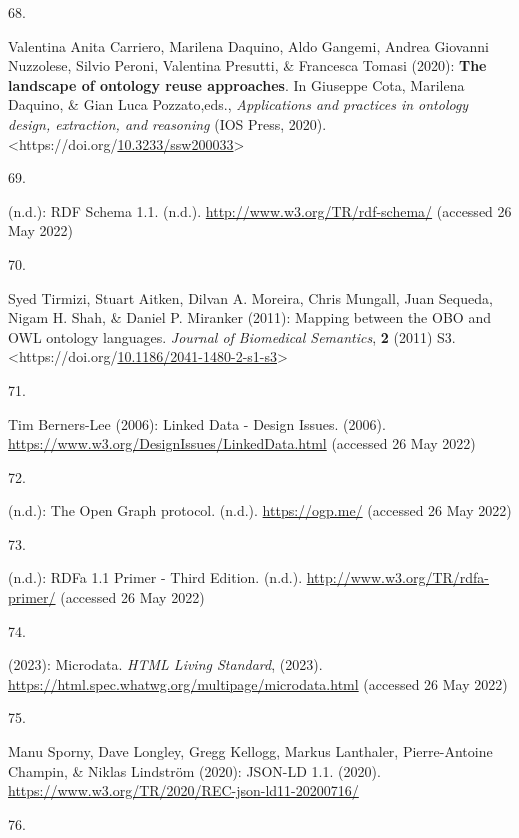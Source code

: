 \begin{thebibliography}{9}
\hypertarget{ref-carrieroLandscapeOntologyReuse2020a}{}
68.

Valentina Anita Carriero, Marilena Daquino, Aldo Gangemi, Andrea
Giovanni Nuzzolese, Silvio Peroni, Valentina Presutti, \& Francesca
Tomasi (2020): \textbf{The landscape of ontology reuse approaches}. In
Giuseppe Cota, Marilena Daquino, \& Gian Luca Pozzato,eds.,
\emph{Applications and practices in ontology design, extraction, and
reasoning} ({IOS Press}, 2020).
\textless https://doi.org/\href{https://doi.org/10.3233/ssw200033}{10.3233/ssw200033}\textgreater{}

\hypertarget{ref-w3-rdf-schema}{}
69.

(n.d.): {RDF Schema} 1.1. (n.d.). \url{http://www.w3.org/TR/rdf-schema/}
(accessed 26 May 2022)

\hypertarget{ref-tirmiziMappingOBOOWL2011a}{}
70.

Syed Tirmizi, Stuart Aitken, Dilvan A. Moreira, Chris Mungall, Juan
Sequeda, Nigam H. Shah, \& Daniel P. Miranker (2011): Mapping between
the {OBO} and {OWL} ontology languages. \emph{Journal of Biomedical
Semantics}, \textbf{2} (2011) S3.
\textless https://doi.org/\href{https://doi.org/10.1186/2041-1480-2-s1-s3}{10.1186/2041-1480-2-s1-s3}\textgreater{}

\hypertarget{ref-LinkedDataDesign}{}
71.

Tim Berners-Lee (2006): Linked {Data} - {Design Issues}. (2006).
\url{https://www.w3.org/DesignIssues/LinkedData.html} (accessed 26 May
2022)

\hypertarget{ref-OpenGraphProtocol}{}
72.

(n.d.): The {Open Graph} protocol. (n.d.). \url{https://ogp.me/}
(accessed 26 May 2022)

\hypertarget{ref-w3-rdfa-primer}{}
73.

(n.d.): {RDFa} 1.1 {Primer} - {Third Edition}. (n.d.).
\url{http://www.w3.org/TR/rdfa-primer/} (accessed 26 May 2022)

\hypertarget{ref-HTMLStandard}{}
74.

(2023): {Microdata}. \emph{{HTML Living Standard}}, (2023).
\url{https://html.spec.whatwg.org/multipage/microdata.html} (accessed 26
May 2022)

\hypertarget{ref-w3-json-ld}{}
75.

Manu Sporny, Dave Longley, Gregg Kellogg, Markus Lanthaler,
Pierre-Antoine Champin, \& Niklas Lindström (2020): {JSON-LD} 1.1.
(2020). \url{https://www.w3.org/TR/2020/REC-json-ld11-20200716/}

\hypertarget{ref-UsageStatisticsJSONLD}{}
76.


\end{thebibliography}
